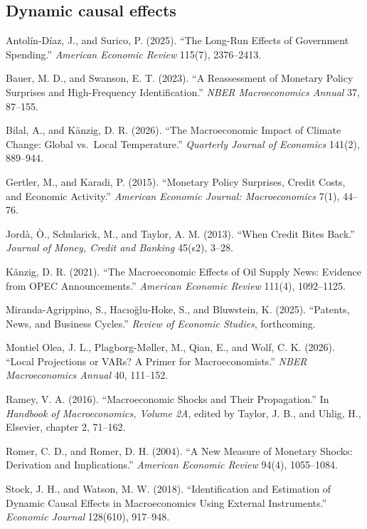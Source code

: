 \documentclass[12pt]{article}
\begin{document}
\subsection{Dynamic causal effects}
\begin{description}
\item Antol\'{i}n-D\'{i}az, J., and Surico, P. (2025). ``The Long-Run Effects of Government Spending.'' \emph{American Economic Review} 115(7), 2376--2413.
\item Bauer, M. D., and Swanson, E. T. (2023). ``A Reassessment of Monetary Policy Surprises and High-Frequency Identification.'' \emph{NBER Macroeconomics Annual} 37, 87--155.
\item Bilal, A., and K\"{a}nzig, D. R. (2026). ``The Macroeconomic Impact of Climate Change: Global vs.\ Local Temperature.'' \emph{Quarterly Journal of Economics} 141(2), 889--944.
\item Gertler, M., and Karadi, P. (2015). ``Monetary Policy Surprises, Credit Costs, and Economic Activity.'' \emph{American Economic Journal: Macroeconomics} 7(1), 44--76.
\item Jord\`{a}, \`{O}., Schularick, M., and Taylor, A. M. (2013). ``When Credit Bites Back.'' \emph{Journal of Money, Credit and Banking} 45(s2), 3--28.
\item K\"{a}nzig, D. R. (2021). ``The Macroeconomic Effects of Oil Supply News: Evidence from OPEC Announcements.'' \emph{American Economic Review} 111(4), 1092--1125.
\item Miranda-Agrippino, S., Hac{\i}o\u{g}lu-Hoke, S., and Bluwstein, K. (2025). ``Patents, News, and Business Cycles.'' \emph{Review of Economic Studies}, forthcoming.
\item[*] Montiel Olea, J. L., Plagborg-M{\o}ller, M., Qian, E., and Wolf, C. K. (2026). ``Local Projections or VARs? A Primer for Macroeconomists.'' \emph{NBER Macroeconomics Annual} 40, 111--152.
\item[*] Ramey, V. A. (2016). ``Macroeconomic Shocks and Their Propagation.'' In \emph{Handbook of Macroeconomics, Volume 2A}, edited by Taylor, J. B., and Uhlig, H., Elsevier, chapter 2, 71--162.
\item Romer, C. D., and Romer, D. H. (2004). ``A New Measure of Monetary Shocks: Derivation and Implications.'' \emph{American Economic Review} 94(4), 1055--1084.
\item Stock, J. H., and Watson, M. W. (2018). ``Identification and Estimation of Dynamic Causal Effects in Macroeconomics Using External Instruments.'' \emph{Economic Journal} 128(610), 917--948.
\end{description}
\end{document}
